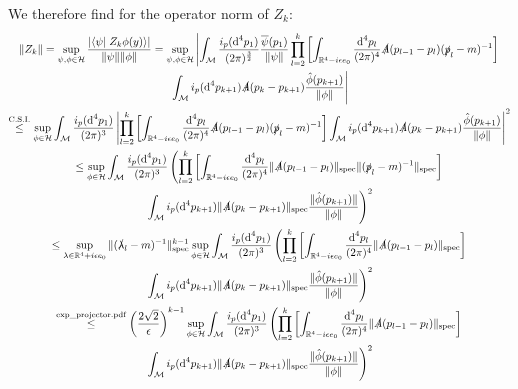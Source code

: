 \documentclass[a4paper,12pt]{article}
\newcommand{\letext}[1]{\ensuremath{\stackrel{\text{#1}}{\le}}}
\begin{document}
We therefore find for the operator norm of \(Z_k\):
\begin{multline}\label{Z_k estimate}
\|Z_k\|=\sup_{\psi,\phi \in \mathcal{H}}\frac{\left|\left<\psi\right| \left. Z_k\phi(y)\right>\right|}{\|\psi\| \|\phi\|}
=\sup_{\psi,\phi \in \mathcal{H}}\left|\int_{\mathcal{M}}\frac{i_p(\text{d}^4p_1)}{(2\pi)^{\frac{3}{2}}}\frac{\overline{\psi}(p_1)}{\|\psi\|}\prod_{l=2}^{k} \left[ \int_{\mathbb{R}^4-i \epsilon e_0}\frac{\text{d}^4p_l}{(2\pi)^{4}} \slashed{A}(p_{l-1}-p_l)  (\slashed{p}_l-m)^{-1}  
 \right]\right.\\
 \left. \int_{\mathcal{M}}  i_p(\text{d}^4p_{k+1})\slashed{A}(p_{k}-p_{k+1})\frac{\hat{\phi}(p_{k+1})}{\|\phi\|}\right|\\
\letext{C.S.I.} \sup_{\phi\in\mathcal{H}}\int_{\mathcal{M}}\frac{i_p(\text{d}^4p_1)}{(2\pi)^{3}}
  \left|\prod_{l=2}^{k} \left[ \int_{\mathbb{R}^4-i \epsilon e_0}\frac{\text{d}^4p_l}{(2\pi)^{4}} \slashed{A}(p_{l-1}-p_l)  (\slashed{p}_l-m)^{-1}  
 \right]\int_{\mathcal{M}}  i_p(\text{d}^4p_{k+1})\slashed{A}(p_{k}-p_{k+1})\frac{\hat{\phi}(p_{k+1})}{\|\phi\|}\right|^2\\
 \le \sup_{\phi\in\mathcal{H}}\int_{\mathcal{M}}\frac{i_p(\text{d}^4p_1)}{(2\pi)^{3}}
  \left(\prod_{l=2}^{k} \left[ \int_{\mathbb{R}^4-i \epsilon e_0}\frac{\text{d}^4p_l}{(2\pi)^{4}} \|\slashed{A}(p_{l-1}-p_l)\|_{\text{spec}} \| (\slashed{p}_l-m)^{-1}\|_{\text{spec}}  
 \right]\right. \\
\left. \int_{\mathcal{M}}  i_p(\text{d}^4p_{k+1})\|\slashed{A}(p_{k}-p_{k+1})\|_{\text{spec}}\frac{\|\hat{\phi}(p_{k+1})\|}{\|\phi\|}\right)^2\\
 \le \sup_{\lambda\in\mathbb{R}^4+i \epsilon e_0}\| (\slashed{\lambda}_l-m)^{-1}\|_{\text{spec}}^{k-1}   \sup_{\phi\in\mathcal{H}}\int_{\mathcal{M}}\frac{i_p(\text{d}^4p_1)}{(2\pi)^{3}}
  \left(\prod_{l=2}^{k} \left[ \int_{\mathbb{R}^4-i \epsilon e_0}\frac{\text{d}^4p_l}{(2\pi)^{4}} \|\slashed{A}(p_{l-1}-p_l)\|_{\text{spec}} 
 \right]\right. \\
\left. \int_{\mathcal{M}}  i_p(\text{d}^4p_{k+1})\|\slashed{A}(p_{k}-p_{k+1})\|_{\text{spec}}\frac{\|\hat{\phi}(p_{k+1})\|}{\|\phi\|}\right)^2\\
 \letext{exp\_projector.pdf} \left(\frac{2\sqrt{2}}{\epsilon}\right)^{k-1}   \sup_{\phi\in\mathcal{H}}\int_{\mathcal{M}}\frac{i_p(\text{d}^4p_1)}{(2\pi)^{3}}
  \left(\prod_{l=2}^{k} \left[ \int_{\mathbb{R}^4-i \epsilon e_0}\frac{\text{d}^4p_l}{(2\pi)^{4}} \|\slashed{A}(p_{l-1}-p_l)\|_{\text{spec}} 
 \right]\right. \\
\left. \int_{\mathcal{M}}  i_p(\text{d}^4p_{k+1})\|\slashed{A}(p_{k}-p_{k+1})\|_{\text{spec}}\frac{\|\hat{\phi}(p_{k+1})\|}{\|\phi\|}\right)^2
 \end{multline}
\end{document}
